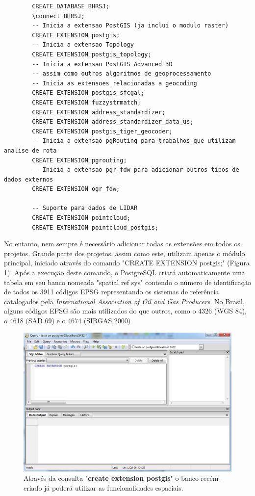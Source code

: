 	\begin{minipage}{\linewidth}
	\begin{lstlisting}
		CREATE DATABASE BHRSJ;
		\connect BHRSJ;
		-- Inicia a extensao PostGIS (ja inclui o modulo raster)
		CREATE EXTENSION postgis;
		-- Inicia a extensao Topology
		CREATE EXTENSION postgis_topology;
		-- Inicia a extensao PostGIS Advanced 3D 
		-- assim como outros algoritmos de geoprocessamento
		-- Inicia as extensoes relacionadas a geocoding
		CREATE EXTENSION postgis_sfcgal;
		CREATE EXTENSION fuzzystrmatch;
		CREATE EXTENSION address_standardizer;
		CREATE EXTENSION address_standardizer_data_us;
		CREATE EXTENSION postgis_tiger_geocoder;
		-- Inicia a extensao pgRouting para trabalhos que utilizam analise de rota
		CREATE EXTENSION pgrouting;
		-- Inicia a extensao pgr_fdw para adicionar outros tipos de dados externos
		CREATE EXTENSION ogr_fdw;
		
		-- Suporte para dados de LIDAR
		CREATE EXTENSION pointcloud;
		CREATE EXTENSION pointcloud_postgis;
	\end{lstlisting}
	\end{minipage}

No entanto, nem sempre é necessário adicionar todas as extensões em todos os projetos. Grande parte dos projetos, assim como este, utilizam apenas o módulo principal, iniciado através do comando "CREATE EXTENSION postgis;" (Figura \ref{fig:createextensionpostgis}). Após a execução deste comando, o PostgreSQL criará automaticamente uma tabela em seu banco nomeada "spatial ref sys" contendo o número de identificação de todos os 3911 códigos EPSG representando os sistemas de referência catalogados pela \textit{International Association of Oil and Gas Producers}. No Brasil, alguns códigos EPSG são mais utilizados do que outros, como o 4326 (WGS 84), o 4618 (SAD 69) e o 4674 (SIRGAS 2000)

	\begin{figure}
		\centering
		\includegraphics[width=1\linewidth]{data/create_extension_postgis}
		\caption{Através da consulta "\textbf{create extension postgis}" o banco recém-criado já poderá utilizar as funcionalidades espaciais.}
		\label{fig:createextensionpostgis}
	\end{figure}

